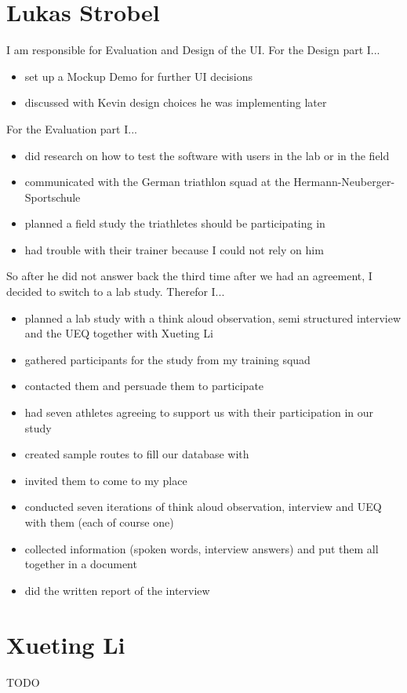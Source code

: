 \documentclass{sigchi}
\begin{document}
\section{Lukas Strobel}
I am responsible for Evaluation and Design of the UI.
For the Design part I...
\begin{itemize}
\item set up a Mockup Demo for further UI decisions
\item discussed with Kevin design choices he was implementing later
\end{itemize}
For the Evaluation part I...
\begin{itemize}
\item did research on how to test the software with users in the lab or in the field
\item communicated with the German triathlon squad at the Hermann-Neuberger-Sportschule
\item planned a field study the triathletes should be participating in
\item had trouble with their trainer because I could not rely on him
\end{itemize}
So after he did not answer back the third time after we had an agreement, I decided to switch to a lab study. Therefor I...
\begin{itemize}
\item planned a lab study with a think aloud observation, semi structured interview and the UEQ together with Xueting Li
\item gathered participants for the study from my training squad
\item contacted them and persuade them to participate
\item had seven athletes agreeing to support us with their participation in our study
\item created sample routes to fill our database with
\item invited them to come to my place
\item conducted seven iterations of think aloud observation, interview and UEQ with them (each of course one)
\item collected information (spoken words, interview answers) and put them all together in a document
\item did the written report of the interview
\end{itemize}

\section{Xueting Li}
TODO

\balance{}
\end{document}
